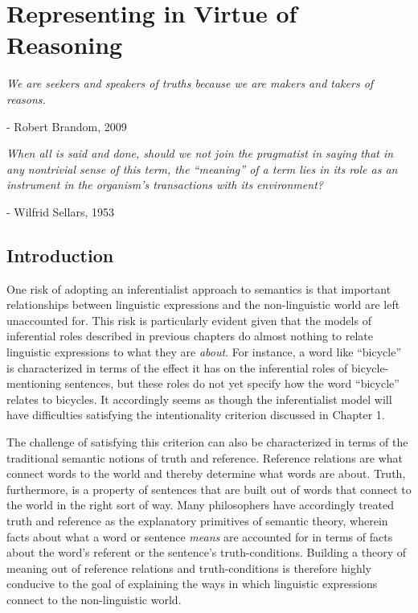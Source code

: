
\chapter{Representing in Virtue of Reasoning}
\renewcommand{\epigraphrule}{0pt}
\setlength{\epigraphwidth}{4.5in}
\epigraph{\textit{We are seekers and speakers of truths because we are makers and takers of reasons.}}{- Robert Brandom, 2009}

\epigraph{\textit{When all is said and done, should we not join the pragmatist in saying that in any nontrivial sense of this term, the ``meaning'' of a term lies in its role as an instrument in the organism's transactions with its environment?}}{- Wilfrid Sellars, 1953}

\section{Introduction}

One risk of adopting an inferentialist approach to semantics is that important relationships between linguistic expressions and the non-linguistic world are left unaccounted for. This risk is particularly evident given that the models of inferential roles described in previous chapters do almost nothing to relate linguistic expressions to what they are \textit{about}. For instance, a word like ``bicycle'' is characterized in terms of the effect it has on the inferential roles of bicycle-mentioning sentences, but these roles do not yet specify how the word ``bicycle'' relates to bicycles. It accordingly seems as though the inferentialist model will have difficulties satisfying the intentionality criterion discussed in Chapter 1.

The challenge of satisfying this criterion can also be characterized in terms of the traditional semantic notions of truth and reference. Reference relations are what connect words to the world and thereby determine what words are about. Truth, furthermore, is a property of sentences that are built out of words that connect to the world in the right sort of way. Many philosophers have accordingly treated truth and reference as the explanatory primitives of semantic theory, wherein facts about what a word or sentence \textit{means} are accounted for in terms of facts about the word's referent or the sentence's truth-conditions. Building a theory of meaning out of reference relations and truth-conditions is therefore highly conducive to the goal of explaining the ways in which linguistic expressions connect to the non-linguistic world.  

